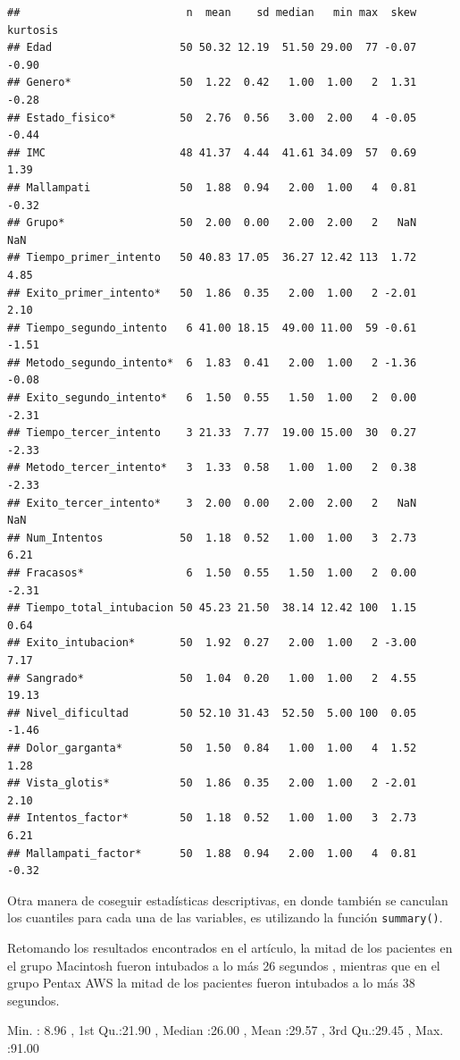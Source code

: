 \documentclass[
]{article}
\begin{document}
\begin{verbatim}
##                          n  mean    sd median   min max  skew kurtosis
## Edad                    50 50.32 12.19  51.50 29.00  77 -0.07    -0.90
## Genero*                 50  1.22  0.42   1.00  1.00   2  1.31    -0.28
## Estado_fisico*          50  2.76  0.56   3.00  2.00   4 -0.05    -0.44
## IMC                     48 41.37  4.44  41.61 34.09  57  0.69     1.39
## Mallampati              50  1.88  0.94   2.00  1.00   4  0.81    -0.32
## Grupo*                  50  2.00  0.00   2.00  2.00   2   NaN      NaN
## Tiempo_primer_intento   50 40.83 17.05  36.27 12.42 113  1.72     4.85
## Exito_primer_intento*   50  1.86  0.35   2.00  1.00   2 -2.01     2.10
## Tiempo_segundo_intento   6 41.00 18.15  49.00 11.00  59 -0.61    -1.51
## Metodo_segundo_intento*  6  1.83  0.41   2.00  1.00   2 -1.36    -0.08
## Exito_segundo_intento*   6  1.50  0.55   1.50  1.00   2  0.00    -2.31
## Tiempo_tercer_intento    3 21.33  7.77  19.00 15.00  30  0.27    -2.33
## Metodo_tercer_intento*   3  1.33  0.58   1.00  1.00   2  0.38    -2.33
## Exito_tercer_intento*    3  2.00  0.00   2.00  2.00   2   NaN      NaN
## Num_Intentos            50  1.18  0.52   1.00  1.00   3  2.73     6.21
## Fracasos*                6  1.50  0.55   1.50  1.00   2  0.00    -2.31
## Tiempo_total_intubacion 50 45.23 21.50  38.14 12.42 100  1.15     0.64
## Exito_intubacion*       50  1.92  0.27   2.00  1.00   2 -3.00     7.17
## Sangrado*               50  1.04  0.20   1.00  1.00   2  4.55    19.13
## Nivel_dificultad        50 52.10 31.43  52.50  5.00 100  0.05    -1.46
## Dolor_garganta*         50  1.50  0.84   1.00  1.00   4  1.52     1.28
## Vista_glotis*           50  1.86  0.35   2.00  1.00   2 -2.01     2.10
## Intentos_factor*        50  1.18  0.52   1.00  1.00   3  2.73     6.21
## Mallampati_factor*      50  1.88  0.94   2.00  1.00   4  0.81    -0.32
\end{verbatim}

Otra manera de coseguir estadísticas descriptivas, en donde también se
canculan los cuantiles para cada una de las variables, es utilizando la
función \texttt{summary()}.

Retomando los resultados encontrados en el artículo, la mitad de los
pacientes en el grupo Macintosh fueron intubados a lo más 26 segundos ,
mientras que en el grupo Pentax AWS la mitad de los pacientes fueron
intubados a lo más 38 segundos.

Min. : 8.96 , 1st Qu.:21.90 , Median :26.00 , Mean :29.57 , 3rd
Qu.:29.45 , Max. :91.00
\end{document}
